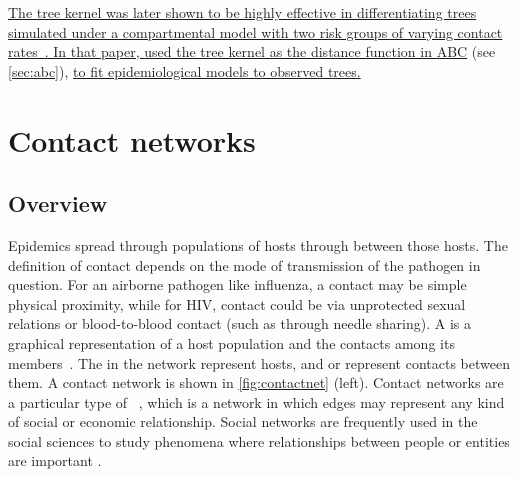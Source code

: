 {\color{blue}\uline{
The tree kernel was later shown to be highly effective in differentiating trees
simulated under a compartmental model with two risk groups of varying contact
rates~\autocite{poon2015phylodynamic}. In that paper,
\citeauthor{poon2015phylodynamic} used the tree kernel as the distance function
in \gls{ABC}} (see \cref{sec:abc}), \uline{to fit epidemiological models to
observed trees. }}

\section{Contact networks}
\label{sec:contactnet}

\subsection{Overview}
\label{subsec:netoverview}

Epidemics spread through populations of hosts through  between
those hosts. The definition of contact depends on the mode of transmission of
the pathogen in question. For an airborne pathogen like influenza, a contact
may be simple physical proximity, while for \gls{HIV}, contact could be via
unprotected sexual relations or blood-to-blood contact (such as through needle
sharing). A  is a graphical representation of a host
population and the contacts among its members~\autocite{klovdahl1985social,
morris1993epidemiology, keeling2005networks}. The  in the network
represent hosts, and  or  represent contacts between
them. A contact network is shown in \cref{fig:contactnet} (left). Contact
networks are a particular type of ~\autocite{moreno1934shall, barnes1954class}, which is a network in
which edges may represent any kind of social or economic relationship. Social
networks are frequently used in the social sciences to study phenomena where
relationships between people or entities are important \autocite[for a review
see][]{wasserman1994social}.

